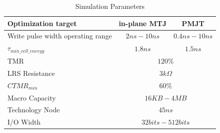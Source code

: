 \begin{table}[t]
\centering
\caption{Simulation Parameters}
\label{tb:parameters}
\vspace{-5pt}
\begin{tabular}{ l | c | c }
\hline \hline
Optimization target & in-plane MTJ & PMJT\\
\hline
Write pulse width operating range & $2ns-10ns$ & $0.4ns-10ns$\\
\hline
$\tau_{min\_cell\_energy}$ & $1.8ns$ & $1.5ns$\\
\hline
TMR & \multicolumn{2}{c}{$120\%$}\\
\hline
LRS Resistance & \multicolumn{2}{c}{$3k\Omega$}\\
\hline
$CTMR_{min}$ & \multicolumn{2}{c}{$60\%$} \\
\hline
Macro Capacity & \multicolumn{2}{c}{$16KB - 4MB$}\\
\hline
Technology Node & \multicolumn{2}{c}{$45ns$}\\
\hline
I/O Width & \multicolumn{2}{c}{$32bits-512bits$}\\
\hline\hline
\end{tabular}
\vspace{-10pt}
\end{table}


